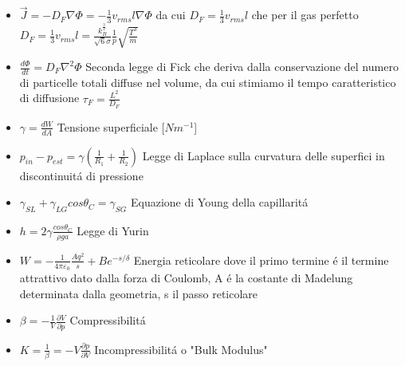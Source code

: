 \documentclass[a4paper]{article}
\begin{document}
\begin{itemize}
	\item $\overrightarrow{J} = -D_F \nabla \Phi = - \frac{1}{3}v_{rms}l \nabla \Phi$ da cui $D_F = \frac{1}{3}v_{rms}l$ che per il gas perfetto $D_F = \frac{1}{3}v_{rms}l = \frac{k_B^\frac{3}{2}}{\sqrt{6} \sigma} \frac{1}{p} \sqrt{\frac{T^3}{m}}$
	\item $\frac{d\Phi}{dt}=D_F \nabla^2 \Phi$ Seconda legge di Fick che deriva dalla conservazione del numero di particelle totali diffuse nel volume, da cui stimiamo il tempo caratteristico di diffusione $\tau_F = \frac{L^2}{D_F} $	
	\item $\gamma = \frac{dW}{dA}$ Tensione superficiale [$Nm^{-1}$]
	\item $p_{in}-p_{est} = \gamma (\frac{1}{R_1}+\frac{1}{R_2})$ Legge di Laplace sulla curvatura delle superfici in discontinuit\'a di pressione
	\item $\gamma_{SL}+\gamma_{LG}cos\theta_C=\gamma_{SG}$ Equazione di Young della capillarit\'a
	\item $h = 2\gamma \frac{cos\theta_C}{\rho g a}$ Legge di Yurin
	\item $W = -\frac{1}{4\pi\varepsilon_0}\frac{Aq^2}{s}+Be^{-s/\delta}$ Energia reticolare dove il primo termine \'e il termine attrattivo dato dalla forza di Coulomb, A \'e la costante di Madelung determinata dalla geometria, s il passo reticolare	
	\item $\beta = -\frac{1}{V}\frac{\partial V}{\partial p}$ Compressibilit\'a
	\item $K=\frac{1}{\beta}=-V \frac{\partial p}{\partial V}$ Incompressibilit\'a o "Bulk Modulus"
	

\end{itemize}
\end{document}
